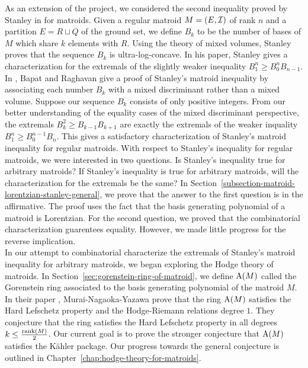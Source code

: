 \documentclass{puthesis-UG}
\begin{document}
As an extension of the project, we considered the second inequality proved by Stanley in \cite{STANLEY} for matroids. Given a regular matroid $M = (E, \mathcal{I})$ of rank $n$ and a partition $E = R \sqcup Q$ of the ground set, we define $B_k$ to be the number of bases of $M$ which share $k$ elements with $R$. Using the theory of mixed volumes, Stanley proves that the sequence $B_k$ is ultra-log-concave. In his paper, Stanley gives a characterization for the extremals of the slightly weaker inequality $B_1^n \geq B_0^{n} B_{n-1}$. In \cite{bapat_raghavan_1997}, Bapat and Raghavan give a proof of Stanley's matroid inequality by associating each number $B_k$ with a mixed discriminant rather than a mixed volume. Suppose our sequence $B_k$ consists of only positive integers. From our better understanding of the equality cases of the mixed discriminant perspective, the extremals $B_k^2 \geq B_{k-1} B_{k+1}$ are exactly the extremals of the weaker inquality $B_{1}^n \geq B_0^{n-1} B_n$. This gives a satisfactory characterization of Stanley's matroid inequality for regular matroids. With respect to Stanley's inequality for regular matroids, we were interested in two questions. Is Stanley's inequality true for arbitrary matroids? If Stanley's inequality is true for arbitrary matroids, will the characterization for the extremals be the same? In Section~\ref{subsection-matroid-lorentzian-stanley-general}, we prove that the answer to the first question is in the affirmative. The proof uses the fact that the basis generating polynomial of a matroid is Lorentzian. For the second question, we proved that the combinatorial characterization guarentees equality. However, we made little progress for the reverse implication. \\

In our attempt to combinatorial characterize the extremals of Stanley's matroid inequality for arbitrary matroids, we began exploring the Hodge theory of matroids. In Section~\ref{sec:gorenstein-ring-of-matroid}, we define $\operatorname{A}(M)$ called the Gorenstein ring associated to the basis generating polynomial of the matroid $M$. In their paper \cite{MNY}, Murai-Nagaoka-Yazawa prove that the ring $\operatorname{A}(M)$ satisfies the Hard Lefschetz property and the Hodge-Riemann relations degree $1$. They conjecture that the ring satisfies the Hard Lefschetz property in all degrees $k \leq \frac{\operatorname{rank} (M)}{2}$. Our current goal is to prove the stronger conjecture that $\operatorname{A}(M)$ satisfies the K\"ahler package. Our progress towards the general conjecture is outlined in Chapter~\ref{chap:hodge-theory-for-matroids}. 
\end{document}
